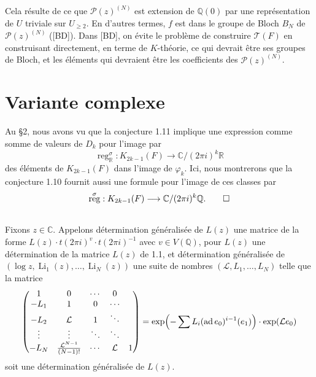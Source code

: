 \documentclass[12pt,a4paper]{article}
\theoremstyle{plain}
\theoremstyle{definition}
\theoremstyle{remark}
\DeclareMathOperator{\reg}{reg}
\DeclareMathOperator{\ad}{ad}
\newcommand{\Q}{\mathbb{Q}}
\newcommand{\R}{\mathbb{R}}
\newcommand{\C}{\mathbb{C}}
\begin{document}
Cela r\'esulte de ce que $\mathcal{P}(z)^{(N)}$ est extension de $\Q(0)$ par une repr\'esentation de $U$ triviale sur $U_{\geq 2}$. En d'autres termes, $f$ est dans le groupe de Bloch $B_N$ de $\mathcal{P}(z)^{(N)}$ ([BD]). Dans [BD], on \'evite le probl\`eme de construire $\mathcal{T}(F)$ en construisant directement, en terme de $K$-th\'eorie, ce qui devrait \^etre ses groupes de Bloch, et les \'el\'ements qui devraient \^etre les coefficients des $\mathcal{P}(z)^{(N)}$.


\section{Variante complexe}

Au \S 2, nous avons vu que la conjecture 1.11 implique une expression comme somme de valeurs de $D_k$ pour l'image par
\begin{equation*}
\reg_\R^\sigma : K_{2k-1}(F) \longrightarrow \C/(2\pi i)^k\R
\end{equation*}
des \'el\'ements de $K_{2k-1}(F)$ dans l'image de $\varphi_k$. Ici, nous montrerons que la conjecture 1.10 fournit aussi une formule pour l'image de ces classes par
\begin{equation*}
\reg^\sigma : K_{2k-1}(F) \longrightarrow \C/(2\pi i)^k\Q.\qedhere
\end{equation*}

\subsection{}

Fixons $z\in\C$. Appelons d\'etermination g\'en\'eralis\'ee de $L(z)$ une matrice de la forme $L(z)\cdot t(2\pi i)^{v}\cdot t(2\pi i)^{-1}$ avec $v\in V(\Q)$, pour $L(z)$ une d\'etermination de la matrice $L(z)$ de 1.1, et d\'etermination g\'en\'eralis\'ee de $(\log z,\operatorname{Li}_1(z),\ldots,\operatorname{Li}_N(z))$ une suite de nombres $(\mathcal{L},L_1,\ldots,L_N)$ telle que la matrice
\begin{equation*}
\begin{pmatrix}
1 & 0 & \cdots & 0\\
-L_1 & 1 & 0 & \cdots\\
-L_2 & \mathcal{L} & 1 & \ddots\\
\vdots & \vdots & \ddots & \ddots\\
-L_N & \frac{\mathcal{L}^{N-1}}{(N-1)!} & \cdots & \mathcal{L} & 1
\end{pmatrix}
= \exp\Bigl(-\sum L_i(\ad e_0)^{i-1}(e_1)\Bigr)\cdot\exp(\mathcal{L}e_0)
\end{equation*}
soit une d\'etermination g\'en\'eralis\'ee de $L(z)$.
\end{document}
